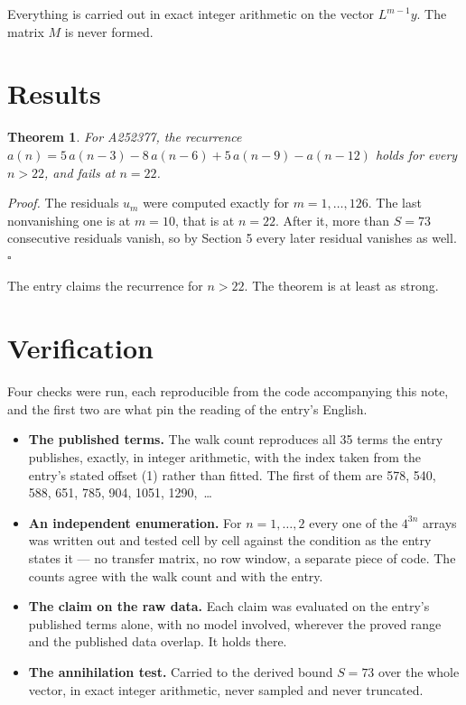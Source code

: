 \documentclass[11pt]{article}
\newtheorem{theorem}{Theorem}
\theoremstyle{definition}
\begin{document}
Everything is carried out in exact integer arithmetic on the vector $L^{m-1}y$. The matrix $M$ is never formed.

\section{Results}

\begin{theorem} For A252377, the recurrence $a(n) = 5\,a(n-3) - 8\,a(n-6) + 5\,a(n-9) - a(n-12)$ holds for every $n > 22$, and fails at $n = 22$.\end{theorem}

{\itshape Proof.} The residuals $u_m$ were computed exactly for $m = 1,\dots,126$. The last nonvanishing one is at $m = 10$, that is at $n = 22$. After it, more than $S = 73$ consecutive residuals vanish, so by Section 5 every later residual vanishes as well. $\square$

The entry claims the recurrence for $n > 22$. The theorem is at least as strong.

\section{Verification}

Four checks were run, each reproducible from the code accompanying this note, and the first two are what pin the reading of the entry's English.

\begin{itemize}

\item {\bfseries The published terms.} The walk count reproduces all 35 terms the entry publishes, exactly, in integer arithmetic, with the index taken from the entry's stated offset (1) rather than fitted. The first of them are 578, 540, 588, 651, 785, 904, 1051, 1290,~\dots

\item {\bfseries An independent enumeration.} For $n = 1,\dots,2$ every one of the $4^{3n}$ arrays was written out and tested cell by cell against the condition as the entry states it --- no transfer matrix, no row window, a separate piece of code. The counts agree with the walk count and with the entry.

\item {\bfseries The claim on the raw data.} Each claim was evaluated on the entry's published terms alone, with no model involved, wherever the proved range and the published data overlap. It holds there.

\item {\bfseries The annihilation test.} Carried to the derived bound $S = 73$ over the whole vector, in exact integer arithmetic, never sampled and never truncated.

\end{itemize}
\end{document}
